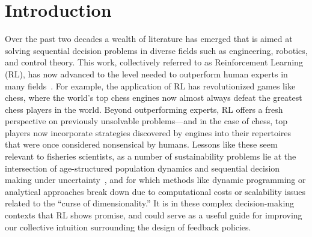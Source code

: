 \documentclass[floatfix,nofootinbib,longbibliography,notitlepage]{revtex4-2}
\begin{document}
\maketitle

\tableofcontents
\makeatletter
\let\toc@pre\relax
\let\toc@post\relax
\makeatother 

%
%
%
\section{Introduction}
\label{sec:intro}

Over the past two decades a wealth of literature has emerged that is aimed at solving sequential decision problems in diverse fields such as engineering, robotics, and control theory.  
This work, collectively referred to as Reinforcement Learning (RL), has now advanced to the level needed to outperform human experts in many fields~\cite{sutton-rl,bertsekas-rl}.  
For example, the application of RL has revolutionized games like chess, where the world’s top chess engines now almost always defeat the greatest chess players in the world. 
Beyond outperforming experts, RL offers a fresh perspective on previously unsolvable problems—and in the case of chess, top players now incorporate strategies discovered by engines into their repertoires that were once considered nonsensical by humans. 
Lessons like these seem relevant to fisheries scientists, as a number of sustainability problems lie at the intersection of age-structured population dynamics and sequential decision making under uncertainty~\cite{walters-hilborn-1978}, and for which methods like dynamic programming or analytical approaches break down due to computational costs or scalability issues related to the “curse of dimensionality.”  
It is in these complex decision-making contexts that RL shows promise, and could serve as a useful guide for improving our collective intuition surrounding the design of feedback policies.
\end{document}
